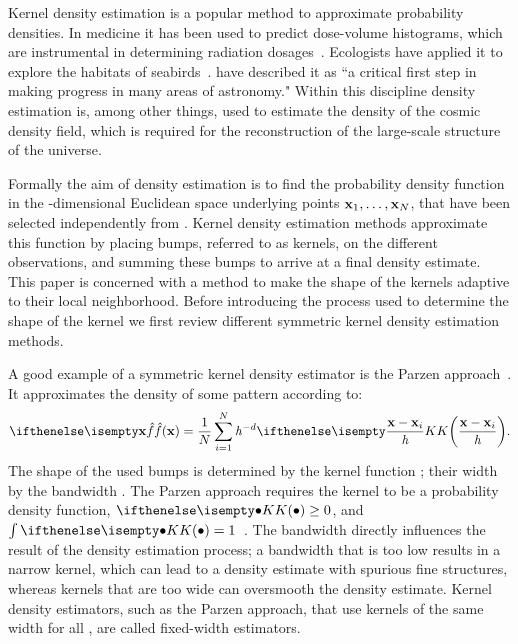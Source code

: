 Kernel density estimation is a popular method to approximate probability densities. In medicine it has been used to predict dose-volume histograms, which are instrumental in determining radiation dosages~\cite{SkarpmanDose2015}. Ecologists have applied it to explore the habitats of seabirds~\cite{lees2016using}. \textcite{ferdosi2011comparison} have described it as ``a critical first step in making progress in many areas of astronomy."  Within this discipline  density estimation is, among other things, used to estimate the density of the cosmic density field, which is required for the reconstruction of the large-scale structure of the universe.

Formally the aim of density estimation is to find the probability density function \varDensityFunction{\varPattern} in the \varDim-dimensional Euclidean space underlying \varNumPatterns points $\varPattern[1], \dotsc, \varPattern[\varNumPatterns]$, that have been selected independently from \varDensityFunction{\varPattern}. Kernel density estimation methods approximate this function by placing bumps, referred to as kernels, on the different observations, and summing these bumps to arrive at a final density estimate. This paper is concerned with a method to make the shape of the kernels adaptive to their local neighborhood. Before introducing the process used to determine the shape of the kernel we first review different symmetric kernel density estimation methods.

	A good example of a symmetric kernel density estimator is the Parzen approach~\cite{parzen1962estimation}. It approximates the density of some pattern \varPattern according to:
	\begin{equation}\label{eq:1:parzen}
		\varEstimatedDensityFunction{\varPattern} = \frac{1}{\varNumPatterns}\sum_{\itXis = 1}^{\varNumPatterns} \varBandwidth^{-\varDim}\varKernel{\frac{\varPattern - \varPattern[\itXis]}{\varBandwidth}}.
	\end{equation}
	The shape of the used bumps is determined by the kernel function \varKernel{\bullet}; their width by the bandwidth \varBandwidth. The Parzen approach requires the kernel to be a probability density function, \ie $\varKernel{\bullet} \geq 0$, and $\int \varKernel{\bullet} = 1$~\cite{silverman1986density}.
	The bandwidth directly influences the result of the density estimation process; a bandwidth that is too low results in a narrow kernel, which can lead to a density estimate with spurious fine structures, whereas kernels that are too wide can oversmooth the density estimate. Kernel density estimators, such as the Parzen approach, that use kernels of the same width for all \varPattern[\itXis], are called fixed-width estimators.

